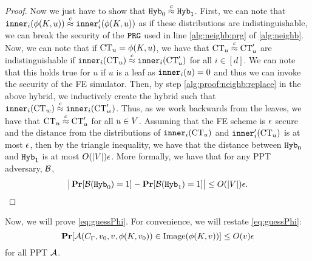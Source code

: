 \begin{lemma}
\begin{proof}
		Now we just have to show that $\texttt{Hyb}_0 \overset{c}{\approx} \texttt{Hyb}_1$. First, we can note
		that $\texttt{inner}_i(\phi(K, u)) \overset{c}{\approx} \texttt{inner}_i'(\phi(K, u))$ as if these distributions are indistinguishable,
		we can break the security of the $\texttt{PRG}$ used in line \ref{alg:neighb:prg} of \cref{alg:neighb}. 
		Now, we can note that if $\text{CT}_u = \phi(K, u)$, we have that $\text{CT}_u \overset{c}{\approx} \text{CT}_u'$ are indistinguishable
		if $\texttt{inner}_i(\text{CT}_u) \overset{c}{\approx} \texttt{inner}_i(\text{CT}_u')$ for all $i \in [d]$. We can note that this holds true for
		$u$ if $u$ is a leaf as $\texttt{inner}_i(u) = 0$ and thus we can invoke the security of the FE simulator.
		Then, by step \ref{alg:proof:neighb:replace} in the above hybrid, we inductively create the hybrid
		such that $\texttt{inner}_i(\text{CT}_w) \overset{c}{\approx} \texttt{inner}_i(\text{CT}_w')$. Thus, as we work backwards from the leaves,
		we have that $\text{CT}_u \overset{c}{\approx} \text{CT}_u'$ for all $u \in V$. Assuming that the FE scheme is $\epsilon$ secure
		and the distance from the distributions of $\texttt{inner}_i(\text{CT}_u)$ and $\texttt{inner}_i'(\text{CT}_u)$ is at most $\epsilon$,
		then by the triangle inequality, we have that the distance between $\texttt{Hyb}_0$ and $\texttt{Hyb}_1$ is at most
		$O(|V|)\epsilon$.
		More formally, we have that for any PPT adversary, $\mathcal{B}$,
		\begin{equation*}
			\big| \operatorname*{\mathbf{Pr}}[\mathcal{B}(\texttt{Hyb}_0) = 1] - \operatorname*{\mathbf{Pr}}[\mathcal{B}(\texttt{Hyb}_1) = 1] \big| \leq O(|V|)\epsilon.
		\end{equation*}
	\end{proof}
\end{lemma}



Now, we will prove \cref{eq:guessPhi}. For convenience, we will restate \cref{eq:guessPhi}:
\begin{equation*}
	\operatorname*{\mathbf{Pr}}[\mathcal{A}(C_\Gamma, v_0, v, \phi(K, v_0)) \in \text{Image}(\phi(K, v))] \leq O(v)\epsilon
\end{equation*}
for all PPT $\mathcal{A}$.

